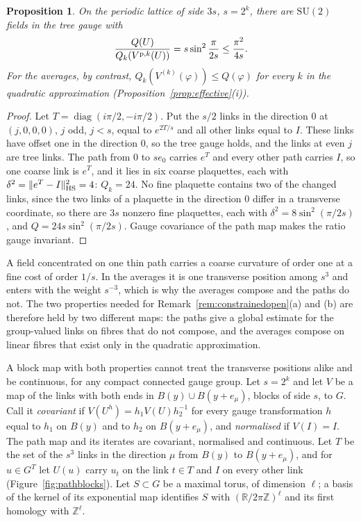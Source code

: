 \documentclass[11pt]{amsart}
\newtheorem{proposition}[theorem]{Proposition}
\theoremstyle{definition}
\theoremstyle{remark}
\numberwithin{equation}{section}
\newcommand{\R}{\mathbb{R}}
\newcommand{\Z}{\mathbb{Z}}
\newcommand{\SU}{\mathrm{SU}}
\begin{document}
\begin{proposition}\label{prop:thinpath}
On the periodic lattice of side $3s$, $s=2^k$, there are $\SU(2)$ fields in
the tree gauge with
\[
\frac{Q(U)}{Q_k(V^{{\rm p},k}(U))}=s\sin^2\frac\pi{2s}\le\frac{\pi^2}{4s}.
\]
For the averages, by contrast, $Q_k(V^{(k)}(\varphi))\le Q(\varphi)$ for
every $k$ in the quadratic approximation
(Proposition~\ref{prop:effective}(i)).
\end{proposition}

\begin{proof}
Let $T=\operatorname{diag}(i\pi/2,-i\pi/2)$. Put the $s/2$ links in the
direction $0$ at $(j,0,0,0)$, $j$ odd, $j<s$, equal to $e^{2T/s}$ and all
other links equal to $I$. These links have offset one in the direction $0$,
so the tree gauge holds, and the links at even $j$ are tree links. The
path from $0$ to $se_0$ carries $e^T$ and every other path carries $I$, so
one coarse link is $e^T$, and it lies in six coarse plaquettes, each with
$\delta^2=\lVert e^T-I\rVert_{\rm HS}^2=4$: $Q_k=24$. No fine plaquette
contains two of the changed links, since the two links of a plaquette in
the direction $0$ differ in a transverse coordinate, so there are $3s$
nonzero fine plaquettes, each with $\delta^2=8\sin^2(\pi/2s)$, and
$Q=24s\sin^2(\pi/2s)$. Gauge covariance of the path map makes the ratio
gauge invariant.
\end{proof}

A field concentrated on one thin path carries a coarse curvature of order
one at a fine cost of order $1/s$. In the averages it is one transverse
position among $s^3$ and enters with the weight $s^{-3}$, which is why the
averages compose and the paths do not. The two properties needed for
Remark~\ref{rem:constrainedopen}(a) and (b) are therefore held by two
different maps: the paths give a global estimate for the group-valued links
on fibres that do not compose, and the averages compose on linear fibres
that exist only in the quadratic approximation.

A block map with both properties cannot treat the transverse positions
alike and be continuous, for any compact connected gauge group. Let $s=2^k$
and let $V$ be a map of the links with both ends in $B(y)\cup B(y+e_\mu)$,
blocks of side $s$, to $G$. Call it \emph{covariant} if
$V(U^h)=h_1V(U)h_2^{-1}$ for every gauge transformation $h$ equal to $h_1$ on
$B(y)$ and to $h_2$ on $B(y+e_\mu)$, and \emph{normalised} if $V(I)=I$. The
path map and its iterates are covariant, normalised and continuous. Let $T$
be the set of the $s^3$ links in the direction $\mu$ from $B(y)$ to
$B(y+e_\mu)$, and for $u\in G^T$ let $U(u)$ carry $u_t$ on the link $t\in T$
and $I$ on every other link (Figure~\ref{fig:pathblocks}). Let $S\subset G$ be a
maximal torus, of dimension $\ell$; a basis of the kernel of its exponential
map identifies $S$ with $(\R/2\pi\Z)^\ell$ and its first homology with
$\Z^\ell$.
\end{document}
